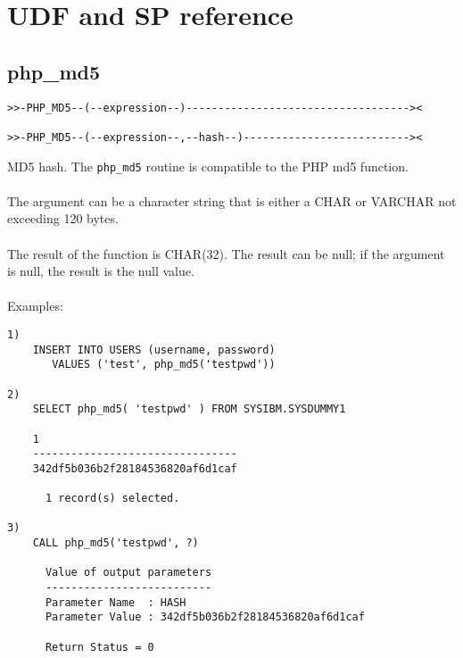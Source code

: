 \section{UDF and SP reference} \label{rtnreference}
\hypertarget{hphpmd5}{}
\subsection{php\_md5} \label{phpmd5}
\begin{verbatim}
>>-PHP_MD5--(--expression--)-----------------------------------><

>>-PHP_MD5--(--expression--,--hash--)--------------------------><
\end{verbatim}
MD5 hash. The {\tt php\_md5} routine is compatible to the PHP md5 function.\\
\\
The argument can be a character string that is either a \mbox{CHAR} or \mbox{VARCHAR} not exceeding 120 bytes.\\
\\
The result of the function is CHAR(32). The result can be null; if the argument is null, the result is the null value.\\
\\
Examples:
\begin{verbatim}
1)
    INSERT INTO USERS (username, password)
       VALUES ('test', php_md5('testpwd'))

2)
    SELECT php_md5( 'testpwd' ) FROM SYSIBM.SYSDUMMY1

    1
    --------------------------------
    342df5b036b2f28184536820af6d1caf

      1 record(s) selected.

3)
    CALL php_md5('testpwd', ?)

      Value of output parameters
      --------------------------
      Parameter Name  : HASH
      Parameter Value : 342df5b036b2f28184536820af6d1caf

      Return Status = 0
\end{verbatim}
\newpage
\hypertarget{haprmd5}{}
